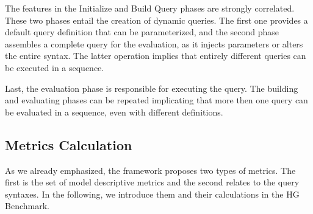 The features in the \textsf{Initialize} and \textsf{Build Query} phases are strongly correlated. These two phases entail the creation of dynamic queries. The first one provides a default query definition that can be parameterized, and the second phase assembles a complete query for the evaluation, as it injects parameters or alters the entire syntax. The latter operation implies that entirely different queries can be executed in a sequence.

Last, the evaluation phase is responsible for executing the query. The building and evaluating phases can be repeated implicating that more then one query can be evaluated in a sequence, even with different definitions.

\subsection{Metrics Calculation}
As we already emphasized, the \framework framework proposes two types of metrics. The first is the set of model descriptive metrics and the second relates to the query syntaxes. In the following, we introduce them and their calculations in the HG Benchmark.

